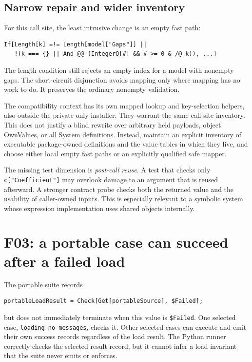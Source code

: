 \documentclass[11pt,letterpaper]{article}
\newcommand{\code}[1]{\texttt{#1}}
\begin{document}
\subsection{Narrow repair and wider inventory}

For this call site, the least intrusive change is an empty fast path:
\begin{lstlisting}
If[Length[k] =!= Length[model["Gaps"]] ||
   !(k === {} || And @@ (IntegerQ[#] && # >= 0 & /@ k)), ...]
\end{lstlisting}
The length condition still rejects an empty index for a model with nonempty gaps. The short-circuit disjunction avoids mapping only where mapping has no work to do. It preserves the ordinary nonempty validation.

The compatibility context has its own mapped lookup and key-selection helpers, also outside the private-only installer. They warrant the same call-site inventory. This does not justify a blind rewrite over arbitrary held payloads, object OwnValues, or all System definitions. Instead, maintain an explicit inventory of executable package-owned definitions and the value tables in which they live, and choose either local empty fast paths or an explicitly qualified safe mapper.

The missing test dimension is \emph{post-call reuse}. A test that checks only \code{c["Coefficient"]} may overlook damage to an argument that is reused afterward. A stronger contract probe checks both the returned value and the usability of caller-owned inputs. This is especially relevant to a symbolic system whose expression implementation uses shared objects internally.

\section{F03: a portable case can succeed after a failed load}
\label{sec:f03}

The portable suite records
\begin{lstlisting}
portableLoadResult = Check[Get[portableSource], $Failed];
\end{lstlisting}
but does not immediately terminate when this value is \code{\$Failed}. One selected case, \nolinkurl{loading-no-messages}, checks it. Other selected cases can execute and emit their own success records regardless of the load result. The Python runner correctly checks the selected result record, but it cannot infer a load invariant that the suite never emits or enforces.~\cite{portable,runner}
\end{document}
